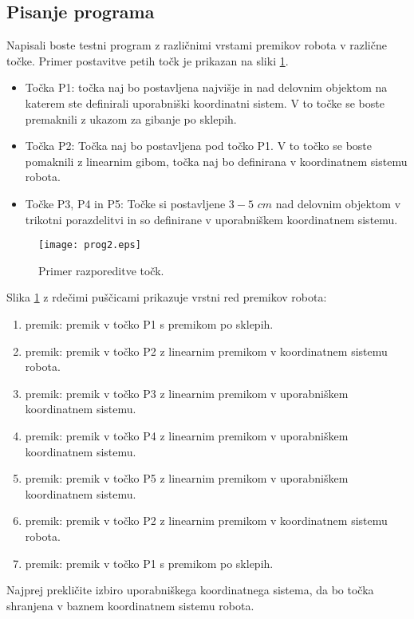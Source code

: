 \subsection{Pisanje programa}
Napisali boste testni program z različnimi vrstami premikov robota v različne točke. Primer postavitve petih točk je prikazan na sliki \ref{fig:prog2}.

\begin{itemize}
	\item Točka P1: točka naj bo postavljena najvišje in nad delovnim objektom na katerem ste definirali uporabniški koordinatni sistem. V to točke se boste premaknili z ukazom za gibanje po sklepih.
	\item Točka P2: Točka naj bo postavljena pod točko P1. V to točko se boste pomaknili z linearnim gibom, točka naj bo definirana v koordinatnem sistemu robota.
	\item Točke P3, P4 in P5: Točke si postavljene $3-5$ $cm$ nad delovnim objektom v trikotni porazdelitvi in so definirane v uporabniškem koordinatnem sistemu.
\end{itemize}

\begin{figure}[!hbt]
	\centering
	\texttt{[image: prog2.eps]}
	\caption{Primer razporeditve točk.}
	\label{fig:prog2}
\end{figure}

Slika \ref{fig:prog2} z rdečimi puščicami prikazuje vrstni red premikov robota:

\begin{enumerate}
	\item premik: premik v točko P1 s premikom po sklepih.
	\item premik: premik v točko P2 z linearnim premikom v koordinatnem sistemu robota.
	\item premik: premik v točko P3 z linearnim premikom v uporabniškem koordinatnem sistemu.	
	\item premik: premik v točko P4 z linearnim premikom v uporabniškem koordinatnem sistemu.	
	\item premik: premik v točko P5 z linearnim premikom v uporabniškem koordinatnem sistemu.	
	\item premik: premik v točko P2 z linearnim premikom v koordinatnem sistemu robota.	
	\item premik: premik v točko P1 s premikom po sklepih.	
\end{enumerate}	

Najprej prekličite izbiro uporabniškega koordinatnega sistema, da bo točka shranjena v baznem koordinatnem sistemu robota.

